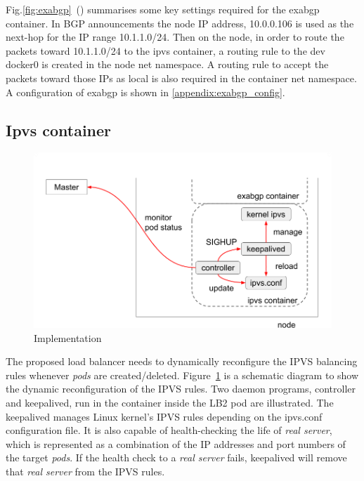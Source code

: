 Fig.\ref{fig:exabgp}~() summarises some key settings required for the exabgp container.
In BGP announcements the node IP address, 10.0.0.106 is used as the next-hop for the IP range 10.1.1.0/24.
Then on the node, in order to route the packets toward 10.1.1.0/24 to the ipvs container, 
a routing rule to the dev docker0 is created in the node net namespace. 
A routing rule to accept the packets toward those IPs as local is also required in the container net namespace. 
A configuration of exabgp is shown in \ref{appendix:exabgp_config}.


\FloatBarrier

\subsection{Ipvs container}\label{sec:ipvs}

\begin{figure}
\includegraphics[width=0.8\columnwidth]{Figs/ipvs-ingress-schem}
\caption{Implementation}
\label{fig:IPVS-ingress-schem}
\end{figure}

The proposed load balancer needs to dynamically reconfigure the IPVS balancing rules whenever {\em pods} are created/deleted. 
Figure~\ref{fig:IPVS-ingress-schem} is a schematic diagram to show the dynamic reconfiguration of the IPVS rules.
Two daemon programs, controller and keepalived, run in the container inside the LB2 pod are illustrated.
The keepalived manages Linux kernel's IPVS rules depending on the ipvs.conf configuration file.
It is also capable of health-checking the life of {\em real server}, 
which is represented as a combination of the IP addresses and port numbers of the target {\em pods}. 
If the health check to a {\em real server} fails, keepalived will remove that {\em real server} from the IPVS rules.

